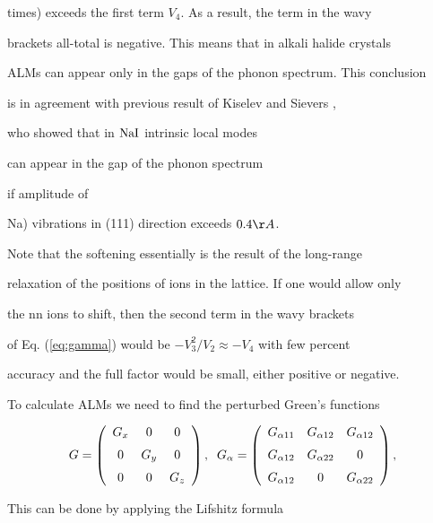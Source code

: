 times) exceeds the first term $V_4$. As a result, the term in the wavy 

brackets all-total is negative. This means that in alkali halide crystals

ALMs can appear only in the gaps of the phonon spectrum. This conclusion

is in agreement with previous result of Kiselev and Sievers \cite{kiselev},

who showed that in ${\rm NaI}$  intrinsic local modes

can appear in the gap of the phonon spectrum 

if amplitude of {\rm Na) vibrations in (111) direction exceeds $0.4 \AA$.



Note that the softening essentially is the result of the long-range

relaxation of the positions of ions in the lattice. If one would allow only 

the nn ions to shift, then the second term  in the wavy brackets 

of Eq. (\ref{eq:gamma}) would be $- V_3^2/ V_2 \approx -V_4$ with few percent

accuracy and the full  factor would be small, either positive or negative.

  

To calculate ALMs we need to find the perturbed Green's functions  

\[ G = \left (\begin{array}{ccc} 

G_x&0&0\\ \noalign{\medskip} 

0&G_y&0\\ \noalign{\medskip} 

0&0&G_z\end{array}

\right ) , \;\;

G_{\alpha} = \left (\begin{array}{ccc} 

G_{\alpha 11}&G_{\alpha 12}&G_{\alpha 12}\\ \noalign{\medskip} 

G_{\alpha 12}&G_{\alpha 22}&0\\ \noalign{\medskip} 

G_{\alpha 12}&0&G_{\alpha 22}\end{array} 

\right ) , \] 

This can be done by applying the Lifshitz formula 

}

